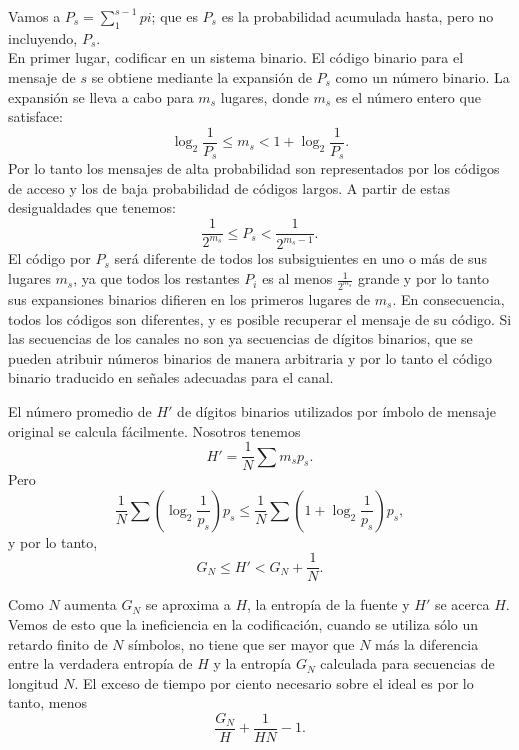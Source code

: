 Vamos a $P_{s}=\sum^{s-1}_{1} pi$; que es $P_{s}$ es la probabilidad
acumulada hasta, pero no incluyendo, $P_{s}$.\\ En primer lugar,
codificar en un sistema binario. El c\'odigo binario para el mensaje
de $s$ se obtiene mediante la expansi\'on de $P_{s}$ como un n\'umero
binario. La expansi\'on se lleva a cabo para $m_{s}$ lugares, donde
$m_{s}$ es el n\'umero entero que satisface:
\begin{equation}
\log_{2} \frac{1}{P_{s}}\leq m_{s} < 1 + \log_{2}\frac{1}{P_{s}} .
\end{equation} 
Por lo tanto los mensajes de alta probabilidad son representados por
los c\'odigos de acceso y los de baja probabilidad de c\'odigos
largos. A partir de estas desigualdades que tenemos:
\begin{equation}
\frac{1}{2^{m_{s}}} \leq P_{s} < \frac{1}{2^{m_{s} -1}}.
\end{equation}
El c\'odigo por $P_{s}$ ser\'a diferente de todos los subsiguientes en
uno o m\'as de sus lugares $m_{s}$, ya que todos los restantes $P_{i}$
es al menos $\frac{1}{2^{m_{s}}}$ grande y por lo tanto sus
expansiones binarios difieren en los primeros lugares de $m_{s}$. En
consecuencia, todos los c\'odigos son diferentes, y es posible
recuperar el mensaje de su c\'odigo. Si las secuencias de los canales
no son ya secuencias de d\'igitos binarios, que se pueden atribuir
n\'umeros binarios de manera arbitraria y por lo tanto el c\'odigo
binario traducido en se\~{n}ales adecuadas para el canal.

El n\'umero promedio de $H'$ de d\'igitos binarios utilizados
por \'imbolo de mensaje original se calcula f\'acilmente. Nosotros
tenemos
\begin{equation}
H' = \frac{1}{N} \sum m_{s} p_{s}.
\end{equation}
Pero
\begin{equation}
\frac{1}{N} \sum 
\left(\log_{2} \frac{1}{p_{s}} \right) p_{s} 
\leq \frac{1}{N} \sum \left( 1+\log_{2} \frac{1}{p_{s}} \right) p_{s},
\end{equation}
y por lo tanto,
\begin{equation}
G_{N} \leq H' < G_{N} + \frac{1}{N}.
\end{equation}

Como $N$ aumenta $G_{N}$ se aproxima a $H$, la entrop\'ia de la fuente
y $H'$ se acerca $H$. Vemos de esto que la ineficiencia en la
codificaci\'on, cuando se utiliza s\'olo un retardo finito de $N$
s\'imbolos, no tiene que ser mayor que $N$ m\'as la diferencia entre
la verdadera entrop\'ia de $H$ y la entrop\'ia $G_{N}$ calculada para
secuencias de longitud $N$. El exceso de tiempo por ciento necesario
sobre el ideal es por lo tanto, menos
\begin{equation}
\frac{G_{N}}{H} + \frac{1}{HN} - 1.
\end{equation}

